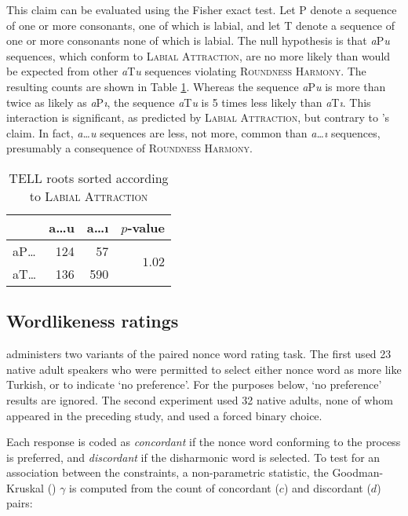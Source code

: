 \noindent 
This claim can be evaluated using the Fisher exact test. Let P denote a sequence of one or more consonants, one of which is labial, and let T denote a sequence of one or more consonants none of which is labial. 
The null hypothesis is that \emph{a}P\emph{u} sequences, which conform to \textsc{Labial Attraction}, are no more likely than would be expected from other \emph{a}T\emph{u} sequences violating \textsc{Roundness Harmony}. 
The resulting counts are shown in Table \ref{las}.
Whereas the sequence \emph{a}P\emph{u} is more than twice as likely as \emph{a}P\emph{ı}, the sequence \emph{a}T\emph{u} is 5 times less likely than \emph{a}T\emph{ı}. 
This interaction is significant, as predicted by \textsc{Labial Attraction}, but contrary to \citeauthor{Clements1982}'s claim.
In fact, \emph{a\ldots{}u} sequences are less, not more, common than \emph{a\ldots{}ı} sequences, presumably a consequence of \textsc{Roundness Harmony}.

\begin{table}[t]
\centering
\begin{tabular}{lrrr}
\toprule
       & a\ldots{}u & a\ldots{}ı & $p$-value                      \\
\midrule
aP\ldots{} & 124    & 57     & \multirow{2}{*}{$1.02$\e{-36}} \\
aT\ldots{} & 136    & 590    &                                \\
\bottomrule
\end{tabular}
\caption{TELL roots sorted according to \textsc{Labial Attraction}}
\label{las}
\end{table}

\subsection{Wordlikeness ratings}

\citet{Zimmer1969} administers two variants of the paired nonce word rating task. 
The first used 23 native adult speakers who were permitted to select either nonce word as more like Turkish, or to indicate `no preference'. 
For the purposes below, `no preference' results are ignored. 
The second experiment used 32 native adults, none of whom appeared in the preceding study, and used a forced binary choice.

Each response is coded as \emph{concordant} if the nonce word conforming to the process is preferred, and \emph{discordant} if the disharmonic word is selected. 
To test for an association between the constraints, a non-parametric statistic, the Goodman-Kruskal (\citeyear{Goodman1954}) $\gamma$ is computed from the count of concordant ($c$) and discordant ($d$) pairs:

